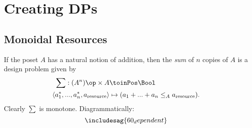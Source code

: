 \section{Creating DPs}


\subsection{Monoidal Resources}
\begin{definition}
If the poset $A$ has a natural notion of addition, then the \emph{sum} of $n$ copies of $A$ is a design problem given by
\begin{align*}
\sum : (A^n)\op \times A &\toinPos \Bool \\
\langle a_1^*, ..., a_n^*, a_\text{resource} \rangle &\mapsto (a_1 + ... + a_n \leq_A a_\text{resource}).
\end{align*}
Clearly $\sum$ is monotone. Diagrammatically:
\[
\includesag{60_dependent}
\]
\end{definition}